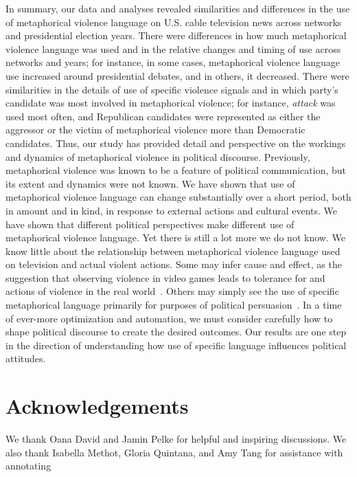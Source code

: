 In summary, our data and analyses revealed similarities and differences in the
use of metaphorical violence language on U.S. cable television news across
networks and presidential election years. There were differences in how much
metaphorical violence language was used and in the relative changes and timing
of use across networks and years; for instance, in some cases, metaphorical
violence language use increased around presidential debates, and in others, it
decreased. There were similarities in the details of use of specific violence
signals and in which party's candidate was most involved in metaphorical
violence; for instance, \emph{attack} was used most often, and Republican
candidates were represented as either the aggressor or the victim of
metaphorical violence more than Democratic candidates.  Thus, our study has
provided detail and perspective on the workings and dynamics of metaphorical
violence in political discourse. Previously, metaphorical violence was known to
be a feature of political communication, but its extent and dynamics were not
known. We have shown that use of metaphorical violence language can change
substantially over a short period, both in amount and in kind, in response to
external actions and cultural events. We have shown that different political
perspectives make different use of metaphorical violence language. Yet there is
still a lot more we do not know.  We know little about the relationship between
metaphorical violence language used on television and actual violent actions.
Some may infer cause and effect, as the suggestion that observing violence in
video games leads to tolerance for and actions of violence in the real
world~\cite{Calvert2017}. Others may simply see the use of specific metaphorical
language primarily for purposes of political
persuasion~\cite{Charteris-Black2009,Mio1997}. In a time of ever-more
optimization and automation, we must consider carefully how to shape political
discourse to create the desired outcomes. Our results are one step in the
direction of understanding how use of specific language influences political
attitudes.  

\section*{Acknowledgements}

We thank Oana David and Jamin Pelke for helpful and inspiring discussions. We also thank
Isabella Methot, Gloria Quintana, and Amy Tang for assistance with annotating
